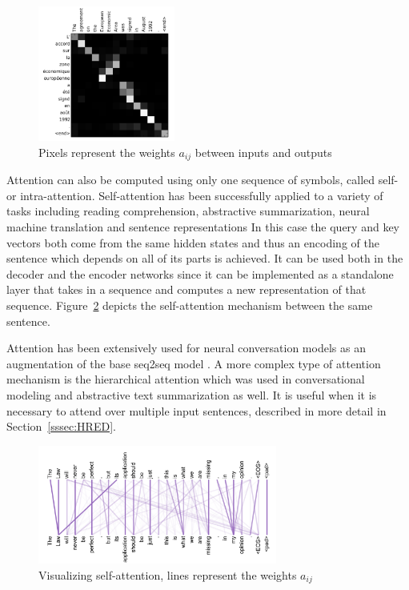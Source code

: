 \documentclass[12pt]{article}
\begin{document}
\begin{figure}[H]
	\centering
	\includegraphics[width=0.4\textwidth]{pics/attn_weights.png}
	\caption{Pixels represent the weights \(a_{ij}\) between inputs and outputs \cite{Bahdanau:2014}}
	\label{fig:attentionb}
\end{figure}
Attention can also be computed using only one sequence of symbols, called self- or intra-attention. Self-attention has been successfully applied to a variety of tasks including reading comprehension, abstractive summarization, neural machine translation and sentence representations \cite{Cheng:2016,Lin:2017,Vaswani:2017,Parikh:2016,Paulus:2017} In this case the query and key vectors both come from the same hidden states and thus an encoding of the sentence which depends on all of its parts is achieved. It can be used both in the decoder and the encoder networks since it can be implemented as a standalone layer that takes in a sequence and computes a new representation of that sequence. Figure~\ref{fig:attentionc} depicts the self-attention mechanism between the same sentence.

Attention has been extensively used for neural conversation models as an augmentation of the base seq2seq model \cite{Yao:2016,Shang:2015,Xing_topic:2017,Zhao:2017}. A more complex type of attention mechanism is the hierarchical attention which was used in conversational modeling \cite{Xing:2017} and abstractive text summarization \cite{Nallapati:2016} as well. It is useful when it is necessary to attend over multiple input sentences, described in more detail in Section~\ref{sssec:HRED}.
\begin{figure}[H]
	\centering
	\includegraphics[width=0.7\textwidth]{pics/self_attn.png}
	\caption{Visualizing self-attention, lines represent the weights \(a_{ij}\) \cite{Vaswani:2017}}
	\label{fig:attentionc}
\end{figure}
\end{document}
